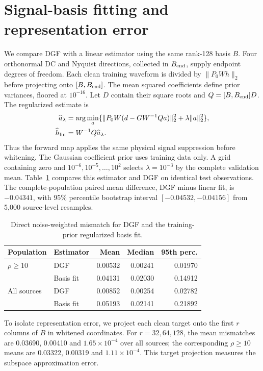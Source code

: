 \documentclass[10pt,prd,aps,a4paper,twocolumn,superscriptaddress,nofootinbib,floatfix]{revtex4-2}
\begin{document}
\section{Signal-basis fitting and representation error}\label{app:basis_comparison}
We compare DGF with a linear estimator using the same rank-128 basis $B$. Four orthonormal DC and Nyquist directions, collected in $B_{\rm end}$, supply endpoint degrees of freedom. Each clean training waveform is divided by $\|P_0Wh\|_2$ before projecting onto $[B,B_{\rm end}]$. The mean squared coefficients define prior variances, floored at $10^{-16}$. Let $D$ contain their square roots and $Q=[B,B_{\rm end}]D$. The regularized estimate is
\begin{align}
\widehat a_\lambda&=\arg\min_a\{\|P_0W(d-GW^{-1}Qa)\|_2^2+\lambda\|a\|_2^2\},\nonumber\\
\widehat h_{\rm lin}&=W^{-1}Q\widehat a_\lambda.
\end{align}
Thus the forward map applies the same physical signal suppression before whitening. The Gaussian coefficient prior uses training data only. A grid containing zero and $10^{-6},10^{-5},\ldots,10^2$ selects $\lambda=10^{-3}$ by the complete validation mean. Table~\ref{tab:basis_fit} compares this estimator and DGF on identical test observations. The complete-population paired mean difference, DGF minus linear fit, is $-0.04341$, with 95\% percentile bootstrap interval $[-0.04532,-0.04156]$ from 5,000 source-level resamples.

\begin{table}[t]\centering\setlength{\tabcolsep}{3pt}
\caption{Direct noise-weighted mismatch for DGF and the training-prior regularized basis fit.}\label{tab:basis_fit}
\begin{tabular}{llrrr}\hline\hline
Population & Estimator & Mean & Median & 95th perc.\\\hline
$\rho\ge10$ & DGF & 0.00532 & 0.00241 & 0.01970\\
& Basis fit & 0.04131 & 0.02030 & 0.14912\\
All sources & DGF & 0.00852 & 0.00254 & 0.02782\\
& Basis fit & 0.05193 & 0.02141 & 0.21892\\
\hline\hline\end{tabular}\end{table}

To isolate representation error, we project each clean target onto the first $r$ columns of $B$ in whitened coordinates. For $r=32,64,128$, the mean mismatches are 0.03690, 0.00410 and $1.65\times10^{-4}$ over all sources; the corresponding $\rho\ge10$ means are 0.03322, 0.00319 and $1.11\times10^{-4}$. This target projection measures the subspace approximation error.


\clearpage

\end{document}
